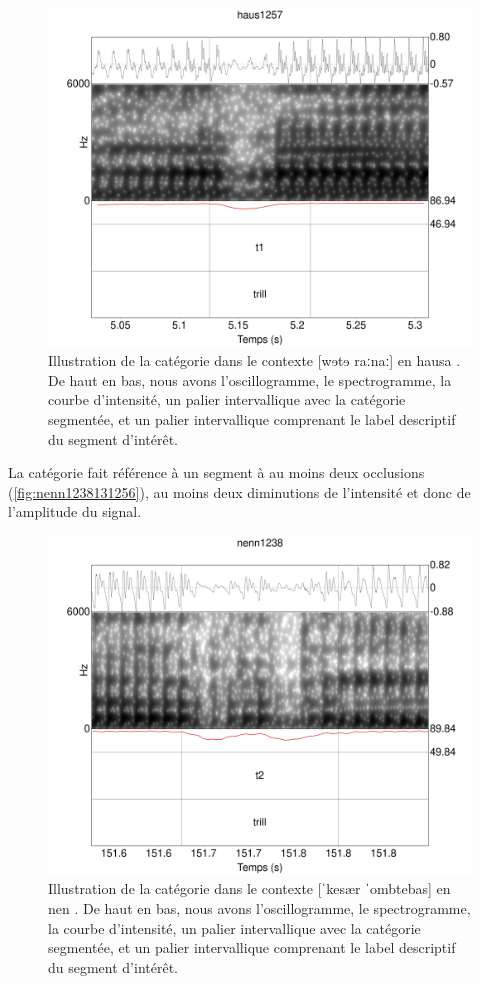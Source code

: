 \begin{figure}
	\centering
	\includegraphics[width=0.8\linewidth]{substance/spectro_images/haus1257_768_4}
	\caption[Illustration de la catégorie ]{Illustration de la catégorie  dans le contexte [wɘtɘ raːnaː] en hausa . De haut en bas, nous avons l'oscillogramme, le spectrogramme, la courbe d'intensité, un palier intervallique avec la catégorie segmentée, et un palier intervallique comprenant le label descriptif du segment d'intérêt.}
	\label{fig:haus125777110}
\end{figure}


La catégorie  fait référence à un segment à au moins deux occlusions (\autoref{fig:nenn1238131256}), au moins deux diminutions de l'intensité et donc de l'amplitude du signal.\\

\begin{figure}
	\centering
	\includegraphics[width=0.8\linewidth]{substance/spectro_images/nenn1238_1312_56}
	\caption[Illustration de la catégorie ]{Illustration de la catégorie  dans le contexte [ˈkesær ˈombtebas] en nen . De haut en bas, nous avons l'oscillogramme, le spectrogramme, la courbe d'intensité, un palier intervallique avec la catégorie segmentée, et un palier intervallique comprenant le label descriptif du segment d'intérêt.}
	\label{fig:nenn1238131256}
\end{figure}

